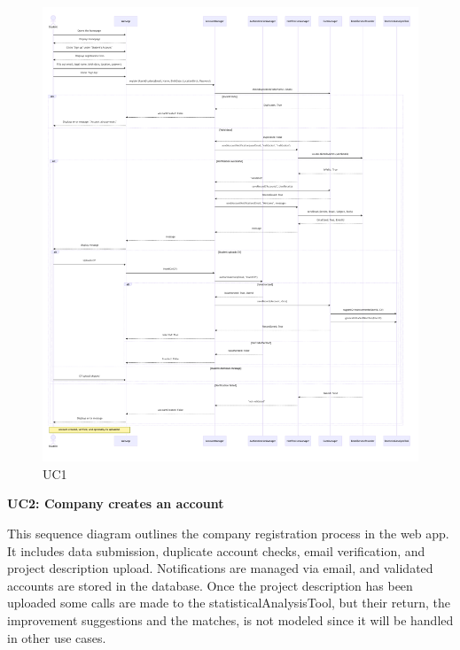 \begin{figure}[H]
    \centering
    \includegraphics[width=1.1\linewidth]{DD//Images/SequenceDiagrams/UC1.pdf}
    \caption{UC1}
\end{figure}

\newpage
\textbf{UC2: Company creates an account}

This sequence diagram outlines the company registration process in the web app. It includes data submission, duplicate account checks, email verification, and project description upload. Notifications are managed via email, and validated accounts are stored in the database. Once the project description has been uploaded some calls are made to the statisticalAnalysisTool, but their return, the improvement suggestions and the matches, is not modeled since it will be handled in other use cases.



